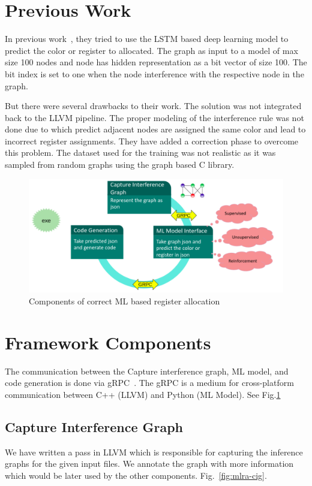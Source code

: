 \section{Previous Work}\label{sec:mlra:pre_work}
In previous work~\cite{dlra:LLVMHPC_2020}, they tried to use the LSTM based deep learning model to predict the color or register to allocated. The graph as input to a model of max size 100 nodes and node has hidden representation as a bit vector of size 100. The bit index is set to one when the node interference with the respective node in the graph. 

But there were several drawbacks to their work. The solution was not integrated back to the LLVM pipeline. The proper modeling of the interference rule was not done due to which predict adjacent nodes are assigned the same color and lead to incorrect register assignments. They have added a correction phase to overcome this problem. The dataset used for the training was not realistic as it was sampled from random graphs using the graph based C library.

\begin{figure}[t]
    \centering
    \includegraphics[scale=0.4]{figures/chapter-5/mlra_components.png}
    \caption{Components of correct ML based register allocation}
     \label{fig:mlra-components}
\end{figure}

\section{Framework Components}\label{sec:mlra:components}
The communication between the Capture interference graph, ML model, and code generation is done via gRPC~\cite{grpc}. The gRPC is a medium for cross-platform communication between C++ (LLVM) and Python (ML Model). See Fig.\ref{fig:mlra-components}
\subsection{Capture Interference Graph}
We have written a pass in LLVM which is responsible for capturing the inference graphs for the given input files. We annotate the graph with more information which would be later used by the other components. Fig.~\ref{fig:mlra-cig}.

